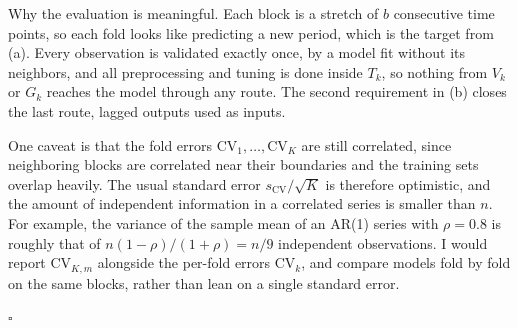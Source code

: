 \documentclass[12pt,letterpaper, onecolumn]{exam}
\begin{document}
\begin{questions}
\begin{solution}
\begin{enumerate}[(a)]
            Why the evaluation is meaningful. Each block is a stretch of $b$ consecutive time points, so each fold looks like predicting a new period, which is the target from (a). Every observation is validated exactly once, by a model fit without its neighbors, and all preprocessing and tuning is done inside $T_k$, so nothing from $V_k$ or $G_k$ reaches the model through any route. The second requirement in (b) closes the last route, lagged outputs used as inputs.

            One caveat is that the fold errors $\text{CV}_1,\dots,\text{CV}_K$ are still correlated, since neighboring blocks are correlated near their boundaries and the training sets overlap heavily. The usual standard error $s_{\text{CV}}/\sqrt{K}$ is therefore optimistic, and the amount of independent information in a correlated series is smaller than $n$. For example, the variance of the sample mean of an AR(1) series with $\rho = 0.8$ is roughly that of $n(1-\rho)/(1+\rho) = n/9$ independent observations. I would report $\text{CV}_{K,m}$ alongside the per-fold errors $\text{CV}_k$, and compare models fold by fold on the same blocks, rather than lean on a single standard error.
        \end{enumerate}

        $\square$
    \end{solution}

\end{questions}
\end{document}
